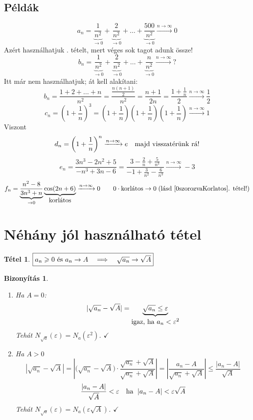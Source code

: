 \documentclass[a4paper,12pt,twoside]{book}
\newtheorem{tetel}{Tétel}[chapter]
\theoremstyle{break}
\newtheorem{bizNL}[biz]{Bizonyítás}
\theoremstyle{plain}
\begin{document}
\subsection{Példák}

\[a_n = \underbrace{\frac{1}{n^2}}_{\to 0} + \underbrace{\frac{2}{n^2}}_{\to 0} + \ldots + \underbrace{\frac{500}{n^2}}_{\to 0} \xrightarrow{n\to\infty} 0\]
Azért használhatjuk . tételt, mert véges sok tagot adunk össze!
\[b_n = \underbrace{\frac{1}{n^2}}_{\to 0} + \underbrace{\frac{2}{n^2}}_{\to 0} + \ldots + \underbrace{\frac{n}{n^2}}_{\to 0} \xrightarrow{n\to\infty} ?\]
Itt már nem használhatjuk; át kell alakítani:
\[b_n = \frac{1+2+\ldots+n}{n^2} = \frac{\frac{n(n+1)}{2}}{n^2} = \frac{n+1}{2n} = \frac{1+\frac{1}{n}}{2} \xrightarrow{n\to\infty} \frac{1}{2}\]
\[c_n = \left(1+\frac{1}{n}\right)^3 = \left(1+\frac{1}{n}\right)\left(1+\frac{1}{n}\right)\left(1+\frac{1}{n}\right) \xrightarrow{n\to\infty} 1 \]
Viszont
\[d_n = \left(1+\frac{1}{n}\right)^n \xrightarrow{n\to\infty} e \quad \hbox{majd visszatérünk rá!}\]
\[e_n = \frac{3n^3-2n^2+5}{-n^3+3n-6} = \frac{3-\frac{2}{n}+\frac{5}{n^3}}{-1+\frac{3}{n^2}-\frac{6}{n^3}} \xrightarrow{n\to\infty} -3\]
\[f_n = \underbrace{\frac{n^2-8}{3n^3+n}}_{\to 0}\underbrace{\cos(2n+6)}_{\hbox{korlátos}} \xrightarrow{n\to\infty} 0 \qquad 0\cdot\hbox{korlátos} \to 0 \; \hbox{(lásd \ref{0szorozvaKorlatos}. tétel!)}\]

\section{Néhány jól használható tétel}

\begin{tetel}$\boxed{a_n\geqslant 0$ és $a_n\to A \quad \Longrightarrow \quad \sqrt{a_n} \to \sqrt{A}}$\end{tetel}
\begin{bizNL}
  \begin{enumerate}
    \item Ha $A=0$:
    \[|\sqrt{a_n}-\sqrt{A}|=\underbrace{\sqrt{a_n}\leq \varepsilon}_{\hbox{igaz, ha $a_n<\varepsilon^2$}}\]
    Tehát $N_{\sqrt{a}}(\varepsilon)=N_a(\varepsilon^2)$. $\checkmark$
    
    \item Ha $A>0$
    \[|\sqrt{a_n}-\sqrt{A}| = \left|\big(\sqrt{a_n}-\sqrt{A}\big)\cdot\frac{\sqrt{a_n}+\sqrt{A}}{\sqrt{a_n}+\sqrt{A}}\right| = \left|\frac{a_n-A}{\sqrt{a_n}+\sqrt{A}}\right| \leqslant \frac{|a_n-A|}{\sqrt{A}}\]
    \[\frac{|a_n-A|}{\sqrt{A}} < \varepsilon \quad \hbox{ha } \; |a_n-A|<\varepsilon\sqrt{A}\]
    Tehát $N_{\sqrt{a}}(\varepsilon)=N_a(\varepsilon\sqrt{A})$. $\checkmark$
    
  \end{enumerate}
\end{bizNL}
\end{document}

